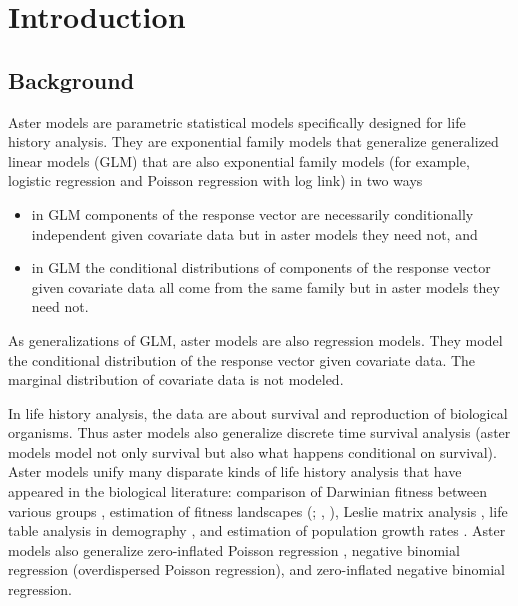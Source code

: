 
\chapter{Introduction}
\label{ch:introduction}

\section{Background}
\label{sec:background}

Aster models \citep*{aster1,aster2,reaster} 
are parametric statistical models
specifically designed for life history analysis.  They are exponential family
models that generalize generalized linear models (GLM) that are also
exponential family models (for example, logistic regression and
Poisson regression with log link) in two ways
\begin{itemize}
\item in GLM components of the response vector are
    necessarily conditionally independent given covariate data
    but in aster models they need not, and
\item in GLM the conditional distributions of components of the
    response vector given covariate data all come from the same family
    but in aster models they need not.
\end{itemize}
As generalizations of GLM, aster models are also regression models.
They model the conditional distribution of the response vector given
covariate data.  The marginal distribution of covariate data is not
modeled.

In life history analysis,
the data are about survival and reproduction
of biological organisms.  Thus aster models also generalize discrete time
survival analysis (aster models model not only survival but also
what happens conditional on survival).
Aster models unify many disparate kinds of life history analysis that have
appeared in the biological literature: comparison of Darwinian fitness between
various groups \citep{aster1,aster2}, estimation of fitness landscapes
(\citealp{lande-arnold}; \citealp{aster2,aster3}, \citealp*{aster-hornworm}),
Leslie matrix analysis
\citep{caswell}, life table analysis in demography \citep{goodman},
and estimation of population growth rates
\citep{fisher,lenski-service,aster2,aster-hornworm}.
Aster models also generalize zero-inflated Poisson regression \citep{lambert},
negative binomial regression (overdispersed Poisson regression),
and zero-inflated negative binomial regression.

